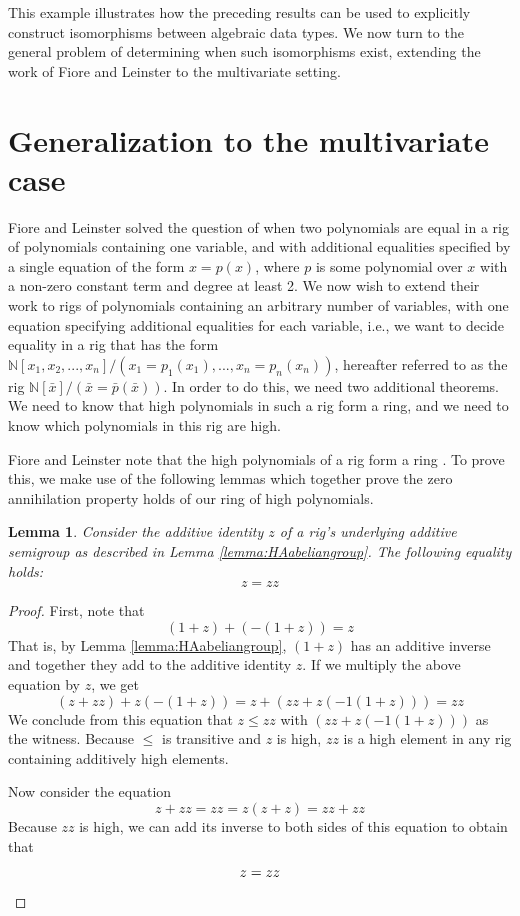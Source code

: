 \documentclass{msthesis}
\newtheorem{lemma}[theorem]{Lemma}
\theoremstyle{definition}
\newcommand{\nat}{\mathbb{N}}
\begin{document}
This example illustrates how the preceding results can be used to explicitly construct isomorphisms between algebraic data types. We now turn to the general problem of determining when such isomorphisms exist, extending the work of Fiore and Leinster to the multivariate setting.

\section{Generalization to the multivariate case}

\newcommand{\ering}{{\mathcal{E}_{\mathrm{CRing}}}}

Fiore and Leinster solved the question of when two polynomials are equal in a rig of polynomials containing one variable, and with additional equalities specified by a single equation of the form $x = p(x)$, where $p$ is some polynomial over $x$ with a non-zero constant term and degree at least 2.  We now wish to extend their work to rigs of polynomials containing an arbitrary number of variables, with one equation specifying additional equalities for each variable, i.e., we want to decide equality in a rig that has the form $\nat[x_1, x_2, ... , x_n]/(x_1=p_1(x_1),..., x_n=p_n(x_n))$, hereafter referred to as the rig $\nat[\bar{x}]/(\bar{x}=\bar{p}(\bar{x}))$.  In order to do this, we need two additional theorems.  We need to know that high polynomials in such a rig form a ring, and we need to know which polynomials in this rig are high.

Fiore and Leinster note that the high polynomials of a rig form a ring \cite{Fiore2005}.  To prove this, we make use of the following lemmas which together prove the zero annihilation property holds of our ring of high polynomials.

\begin{lemma}\label{lemma:zz=z}
    Consider the additive identity $z$ of a rig's underlying additive semigroup as described in Lemma \ref{lemma:HAabeliangroup}. The following equality holds:
    \[ z = zz \]
\end{lemma}
\begin{proof}
    First, note that 
    \[ (1 + z) + (-(1 + z)) = z \]
    That is, by Lemma \ref{lemma:HAabeliangroup}, $(1 + z)$ has an additive inverse and together they add to the additive identity $z$. If we multiply the above equation by $z$, we get
    \[ (z + zz) + z(-(1 + z)) = z + (zz + z(-1(1 + z))) = zz\]
    We conclude from this equation that $z \le zz$ with $(zz + z(-1(1 + z)))$ as the witness.  Because $\le$ is transitive and $z$ is high, $zz$ is a high element in any rig containing additively high elements.

    Now consider the equation
    \[ z + zz = zz = z(z + z) = zz + zz \]
    Because $zz$ is high, we can add its inverse to both sides of this equation to obtain that
    \[ z = zz  \qedhere \]
\end{proof}
\end{document}
